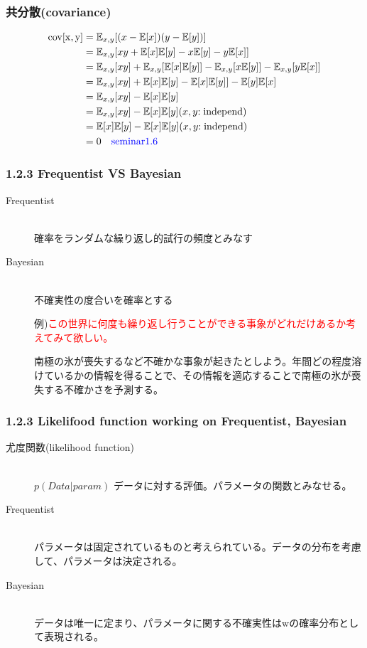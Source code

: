 \documentclass[dvipdfmx]{beamer}
\theoremstyle{definition}
\begin{document}
\begin{frame}
  \frametitle{共分散(covariance)}
    \begin{align*}
      \rm{cov}[x,y] &= \mathbb{E}_{x,y}[(x-\mathbb{E}[x])(y-\mathbb{E}[y])] \\
                    &= \mathbb{E}_{x,y}[xy + \mathbb{E}[x]\mathbb{E}[y] -x\mathbb{E}[y] -y\mathbb{E}[x]] \\
                    &= \mathbb{E}_{x,y}[xy] +\mathbb{E}_{x,y}[\mathbb{E}[x]\mathbb{E}[y]] -\mathbb{E}_{x,y}[x\mathbb{E}[y]] -\mathbb{E}_{x,y}[y\mathbb{E}[x]] \\
                    &= \mathbb{E}_{x,y}[xy] +\mathbb{E}[x]\mathbb{E}[y] -\mathbb{E}[x]\mathbb{E}[y]] -\mathbb{E}[y]\mathbb{E}[x] \\
                    &= \mathbb{E}_{x,y}[xy] -\mathbb{E}[x]\mathbb{E}[y] \\
                    &= \mathbb{E}_{x,y}[xy] -\mathbb{E}[x]\mathbb{E}[y] (x,y \rm{:independ})\\
                    &= \mathbb{E}[x]\mathbb{E}[y] -\mathbb{E}[x]\mathbb{E}[y] (x,y \rm{:independ})\\
                    &= 0 \quad \textcolor{blue}{\rm{seminar1.6}}
    \end{align*}
\end{frame}

\begin{frame}
  \frametitle{1.2.3 Frequentist VS Bayesian}
  \begin{description}
    \item[Frequentist] \hfill \\
      確率をランダムな繰り返し的試行の頻度とみなす
    \item[Bayesian] \hfill \\
      不確実性の度合いを確率とする
      
      例)\textcolor{red}{この世界に何度も繰り返し行うことができる事象がどれだけあるか考えてみて欲しい。}
      
      南極の氷が喪失するなど不確かな事象が起きたとしよう。年間どの程度溶けているかの情報を得ることで、その情報を適応することで南極の氷が喪失する不確かさを予測する。
  \end{description}
\end{frame}

\begin{frame}
  \frametitle{1.2.3 Likelifood function  working on Frequentist, Bayesian}
  \begin{description}
    \item[尤度関数(likelihood function)] \hfill \\
      $p(Data|param)$ \quad データに対する評価。パラメータの関数とみなせる。
    \item[Frequentist] \hfill \\
      パラメータは固定されているものと考えられている。データの分布を考慮して、パラメータは決定される。
    \item[Bayesian] \hfill \\
      データは唯一に定まり、パラメータに関する不確実性はwの確率分布として表現される。
  \end{description}
\end{frame}
\end{document}

